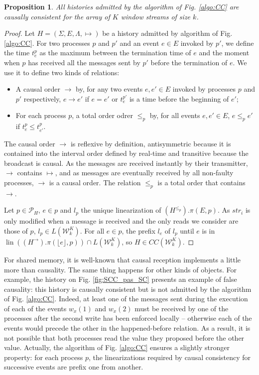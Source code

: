\documentclass[9pt,numbers]{sigplanconf}
\newtheorem{proposition}{Proposition}
\DeclareMathOperator{\lin}{lin}
\begin{document}
\begin{proposition}\label{prop:causal:impl_CC}
  All histories admitted by the algorithm of Fig. \ref{algo:CC} are causally consistent for the array of $K$ window streams of size $k$.
\end{proposition}
\begin{proof}
  Let $H=(\Sigma, E, \Lambda, \mapsto)$ be a history admitted by algorithm of Fig. \ref{algo:CC}. 
  For two processes $p$ and $p'$ and an event $e\in E$ invoked by $p'$, 
  we define the time $t_e^p$ as the maximum between the termination time of $e$ and the
  moment when $p$ has received all the messages sent by $p'$ before the termination of $e$.
  We use it to define two kinds of relations: 
  \begin{itemize}
  \item A causal order $\rightarrow$ by, for any two events $e, e'\in E$ invoked by processes 
    $p$ and $p'$ respectively, $e\rightarrow e'$ if $e=e'$ or $t_e^{p'}$ is a time before the beginning 
    of $e'$;
  \item For each process $p$, a total order odrer $\le_p$ by, for all events $e, e'\in E$, 
    $e\le_p e'$ if $t_e^{p}\le t_{e'}^{p}$.
  \end{itemize}
  The causal order $\rightarrow$ is reflexive by definition, antisymmetric because it is contained into the interval order defined by real-time
  and transitive because the broadcast is causal. As the messages are received instantly by their transmitter, $\rightarrow$
  contains $\mapsto$, and as messages are eventually received by all non-faulty processes, $\rightarrow$ is a causal order. 
  The relation $\le_p$ is a total order that contains $\rightarrow$.

  Let $p \in \mathscr{P}_H$, $e\in p$ and $l_p$ the unique linearization of $(H^{\le_p}).\pi(E, p)$. As $str_i$ is
  only modified when a message is received and the only reads we consider are those of $p$, $l_p\in L(\mathscr{W}_k^K)$. 
  For all $e\in p$, the prefix $l_e$ of $l_p$ until $e$ is in $\lin((H^\rightarrow).\pi(\lfloor e\rfloor, p))\cap L(\mathscr{W}_k^K)$,
  so $H\in CC(\mathscr{W}_k^K)$. 
\end{proof}

For shared memory, it is well-known \cite{gambhire2000reducing} 
that causal reception implements a little more than causality. The same thing happens for other kinds of objects. 
For example, the history on Fig. \ref{fig:SCC_pas_SC} presents an example of false causality: 
this history is causally consistent but is not admitted by the algorithm of Fig. \ref{algo:CC}. Indeed, at least 
one of the messages sent during the execution of each of the events $w_x(1)$ and $w_x(2)$ 
must be received by one of the processes after the second write has 
been enforced locally -- otherwise each of the events would precede the other in the happened-before relation.
As a result, it is not possible that both processes read the value they proposed before the other value.
Actually, the algorithm of Fig. \ref{algo:CC} ensures a slightly stronger property: for each process $p$, the linearizations 
required by causal consistency for successive events are prefix one from another. 
\end{document}
